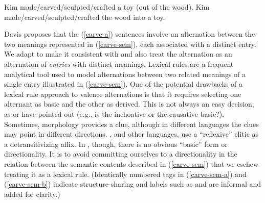 \documentclass[output=paper,biblatex,babelshorthands,newtxmath,draftmode,colorlinks, citecolor=brown]{langscibook}
\begin{document}
\begin{exe}
\ex\label{carve}
\begin{xlist}
	\ex\label{carve-a} Kim made/carved/sculpted/crafted a toy (out of the wood).
	\ex\label{carve-b} Kim made/carved/sculpted/crafted the wood into a toy.
\end{xlist}
\end{exe}

\largerpage
\noindent
Davis proposes that the (\ref{carve-a}) sentences involve an alternation between the two meanings
represented in (\ref{carve-sem}), each associated with a distinct entry. We adapt \citet{Davis2001}
to make it consistent with \citet{KoenigandDavis2006} and also treat the alternation as an
alternation of \emph{entries} with distinct meanings. 
Lexical rules are a frequent analytical tool used to model alternations between two related meanings
of a single entry illustrated in (\ref{carve-sem}). One of the potential drawbacks of a lexical rule
approach to valence alternations is that it requires selecting one alternant as basic and the other
as derived. This is not always an easy decision, as \citet[731--732]{Goldberg1991} or
\citet{LevinandRappaport1994} have pointed out (e.g., is the inchoative or the causative
basic?). Sometimes, morphology provides a clue, although in different languages the clues may point
in different directions.  , and other  languages, use a ``reflexive''
clitic as a detransitivizing affix.  In , though, there is no obvious ``basic'' form or
directionality. It is to avoid committing ourselves to a directionality in the relation between the
semantic contents described in (\ref{carve-sem}) that we eschew treating it as a lexical
rule. (Identically numbered tags in (\ref{carve-sem-a}) and (\ref{carve-sem-b}) indicate
structure-sharing and labels such as  and  are informal and added for clarity.)


\end{document}
